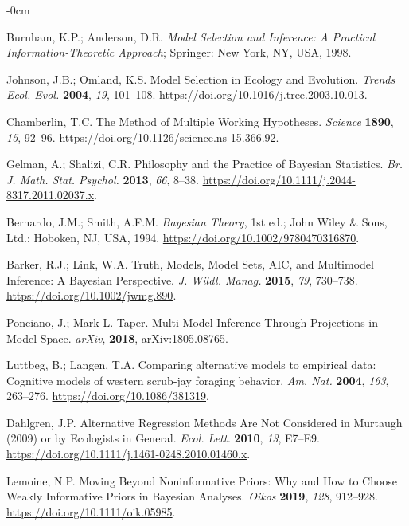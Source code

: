 \documentclass[entropy,article,accept,pdftex,moreauthors]{Definitions/mdpi}
\begin{document}
\begin{adjustwidth}{-\extralength}{0cm}
\begin{thebibliography}{999}
Burnham, K.P.;  Anderson, D.R. \emph{Model Selection
and Inference: A Practical Information-Theoretic Approach}; Springer: New York, NY, USA, 1998.

Johnson, J.B.;  Omland, K.S. Model Selection in
Ecology and Evolution.  \emph{Trends Ecol. Evol.} \textbf{2004}, \emph{19}, 
101--108. \url{https://doi.org/10.1016/j.tree.2003.10.013}.

Chamberlin, T.C. The Method of Multiple Working Hypotheses. 
\emph{Science} \textbf{1890}, \emph{15},  92--96.
\url{https://doi.org/10.1126/science.ns-15.366.92}.

Gelman, A.; Shalizi, C.R. Philosophy and the
Practice of {Bayesian} Statistics.  \emph{Br. J. Math. Stat. Psychol.} \textbf{2013}, \emph{66}, 8--38.
\url{https://doi.org/10.1111/j.2044-8317.2011.02037.x}.

Bernardo, J.M.;  Smith, A.F.M. \emph{Bayesian
{Theory}}, 1st ed.; {John Wiley \& Sons, Ltd.}:  Hoboken, NJ, USA, %
1994.
\url{https://doi.org/10.1002/9780470316870}.

Barker, R.J.;  Link, W.A. Truth, Models, Model
Sets, {AIC}, and Multimodel Inference: {A} {Bayesian} Perspective.
\emph{ J. Wildl. Manag.} \textbf{2015}, \emph{79}, 730--738.
\url{https://doi.org/10.1002/jwmg.890}.

Ponciano, J.; Mark L. Taper. Multi-Model Inference
Through Projections in Model Space.  \emph{arXiv},  \textbf{2018}, 	arXiv:1805.08765.

Luttbeg, B.; Langen, T.A.  Comparing alternative models to empirical data: Cognitive models of western scrub-jay foraging behavior. \emph{ Am. Nat.} \textbf{2004}, \emph{163}, 263--276.
\url{https://doi.org/10.1086/381319}.

Dahlgren, J.P.  {Alternative Regression Methods Are Not
Considered in {Murtaugh} (2009) or by Ecologists in General.}
\emph{Ecol. Lett.} \textbf{2010}, \emph{13},  E7--E9.
\url{https://doi.org/10.1111/j.1461-0248.2010.01460.x}.

Lemoine, N.P. Moving Beyond Noninformative Priors: Why and
How to Choose Weakly Informative Priors in {Bayesian} Analyses. 
\emph{Oikos} \textbf{2019}, \emph{128}, 912--928. \url{https://doi.org/10.1111/oik.05985}.


\end{thebibliography}
\end{adjustwidth}
\end{document}
